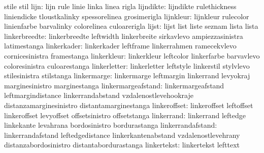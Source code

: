                            stile                     stil
                     lijn: lijn                      rule
                           linie                     linka
                           linea                     rigla
                lijndikte: lijndikte                 rulethickness
                           liniendicke               tloustkalinky
                           spessorelinea             grosimerigla
                lijnkleur: lijnkleur                 rulecolor
                           linienfarbe               barvalinky
                           colorelinea               culoarerigla
                    lijst: lijst                     list
                           liste                     seznam
                           lista                     lista
            linkerbreedte: linkerbreedte             leftwidth
                           linkerbreite              sirkavlevo
                           ampiezzasinistra          latimestanga
              linkerkader: linkerkader               leftframe
                           linkerrahmen              ramecekvlevo
                           cornicesinistra           framestanga
              linkerkleur: linkerkleur               leftcolor
                           linkerfarbe               barvavlevo
                           coloresinistra            culoarestanga
             linkerletter: linkerletter              leftstyle
                           linkerstil                stylvlevo
                           stilesinistra             stilstanga
              linkermarge: linkermarge               leftmargin
                           linkerrand                levyokraj
                           marginesinistro           marginestanga
       linkermargeafstand: linkermargeafstand        leftmargindistance
                           linkerrandabstand         vzdalenostlevehookraje
                           distanzamarginesinistro   distantamarginestanga
             linkeroffset: linkeroffset              leftoffset
                           linkeroffset              levyoffset
                           offsetsinistro            offsetstanga
               linkerrand: linkerrand                leftedge
                           linkekante                levahrana
                           bordosinistro             bordurastanga
        linkerrandafstand: linkerrandafstand         leftedgedistance
                           linkerkantenabstand       vzdalenostlevehrany
                           distanzabordosinistro     distantabordurastanga
              linkertekst: linkertekst               lefttext
